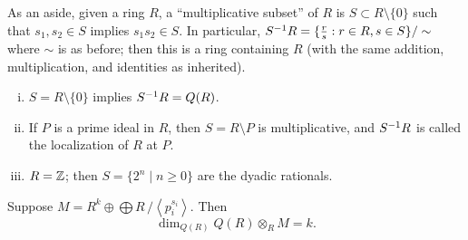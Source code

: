 As an aside, given a ring $R$, a ``multiplicative subset'' of $R$ is $S \subset R \setminus \{0\}$ such that $s_1, s_2 \in S$ implies $s_1 s_2 \in S$. In particular, $S^{-1} R = \{\frac{r}{s} : r \in R, s \in S\} / \sim$ where $\sim$ is as before; then this is a ring containing $R$ (with the same addition, multiplication, and identities as inherited).
\begin{enumerate}[(i)]
    \item $S = R \setminus \{0\}$ implies $S^{-1} R = Q(R)$.
    \item If $P$ is a prime ideal in $R$, then $S = R \setminus P$ is multiplicative, and $S^{-1} R$ is called the localization of $R$ at $P$.
    \item $R = \mathbb Z$; then $S = \{2^n \mid n \geq 0\}$ are the dyadic rationals.
\end{enumerate}
\begin{proposition}
    Suppose $M = R^k \oplus \bigoplus R\,/\!\left<p_i^{s_i}\right>$. Then
    \[ \dim_{Q(R)} Q(R) \otimes_R M = k. \]
\end{proposition}